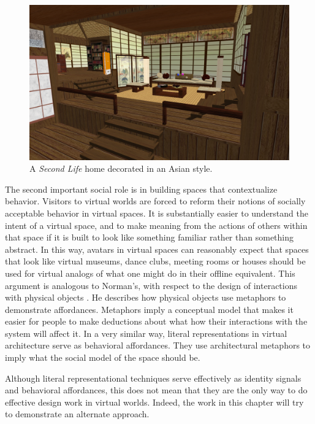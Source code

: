\begin{figure}[t]
	\includegraphics{figures/asian_home.png}
	\caption{A \emph{Second Life} home decorated in an Asian style.}
	\label{fig:asian_home}
\end{figure}

The second important social role is in building spaces that contextualize behavior. Visitors to virtual worlds are forced to reform their notions of socially acceptable behavior in virtual spaces. It is substantially easier to understand the intent of a virtual space, and to make meaning from the actions of others within that space if it is built to look like something familiar rather than something abstract. In this way, avatars in virtual spaces can reasonably expect that spaces that look like virtual museums, dance clubs, meeting rooms or houses should be used for virtual analogs of what one might do in their offline equivalent. This argument is analogous to Norman's, with respect to the design of interactions with physical objects \citep{Norman:2002tv}. He describes how physical objects use metaphors to demonstrate affordances. Metaphors imply a conceptual model that makes it easier for people to make deductions about what how their interactions with the system will affect it. In a very similar way, literal representations in virtual architecture serve as behavioral affordances. They use architectural metaphors to imply what the social model of the space should be. 

Although literal representational techniques serve effectively as identity signals and behavioral affordances, this does not mean that they are the only way to do effective design work in virtual worlds. Indeed, the work in this chapter will try to demonstrate an alternate approach.

